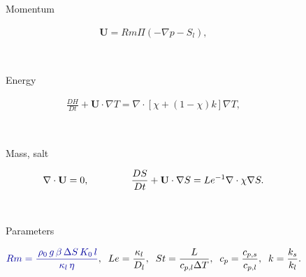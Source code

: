 \documentclass[landscape,24pt, a0paper,colspace=10mm,blockverticalspace=12mm]{tikzposter}
\newcommand{\eqnLabel}[1]{\textcolor{eqnLabelGray}{#1}}
\begin{document}
\begin{columns}
\begin{subcolumns}
{\begin{minipage}[t]{0.55\linewidth}
 \vspace{-0.1em}
\begin{minipage}[t]{6cm}
\eqnLabel{Momentum}
\end{minipage}
\begin{minipage}[t]{0.4\linewidth}
\vspace{-1.5em}
\begin{align} 
    \mathbf{U} = Rm \Pi \left(-\nabla p - S_l \right), \nonumber
  \end{align}
\end{minipage} \hfill \\
\begin{minipage}[t]{6cm}
\vspace{0.25em}
\eqnLabel{Energy}
\end{minipage}
\begin{minipage}[t]{0.4\linewidth}
\vspace{-0.5em}
\begin{align} 
    \frac{D H}{Dt} + \mathbf{U} \cdot \nabla T = \nabla \cdot \left[\chi + (1-\chi) k \right] \nabla T , \nonumber \label{eq:energy-cons} 
  \end{align}
\end{minipage} \hfill \\
\begin{minipage}[t]{6cm}
\vspace{1em}
\eqnLabel{Mass, salt}
\end{minipage}
\begin{minipage}[t]{0.48\linewidth}
\vspace{-0.0em}
\begin{align} 
    \nabla \cdot \mathbf{U} = 0, \hspace{10ex} \frac{D S}{Dt} + \mathbf{U} \cdot \nabla S = \Le^{-1} \nabla \cdot \chi \nabla S. \nonumber
     \end{align}
\end{minipage} \hfill \\
\begin{minipage}[t]{6cm}
\vspace{1.2em}
\eqnLabel{Parameters}
\end{minipage}
\begin{minipage}[t]{0.78\linewidth}
\vspace{0.2em}
\begin{align} 
   \textcolor{dukeblue}{ Rm = \frac{ \, \rho_0 \, g \, \beta \, \Delta S \, K_0 \,l}{\kappa_l \, \eta}}, \;\; Le = \frac{\kappa_l}{D_l}, \; \;St = \frac{L}{c_{p,l} \Delta T}, \; \; c_p = \frac{c_{p,s}}{c_{p,l}}, \; \; k = \frac{k_{s}}{k_{l}}. \nonumber
\end{align}
\end{minipage}


\end{minipage}}
\end{subcolumns}
\end{columns}
\end{document}
